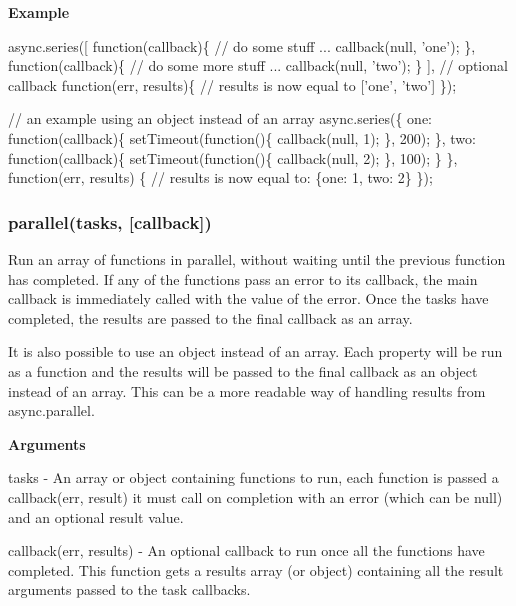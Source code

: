 {\bfseries Example}


\begin{DoxyCode}
async.series([
    function(callback)\{
        // do some stuff ...
        callback(null, 'one');
    \},
    function(callback)\{
        // do some more stuff ...
        callback(null, 'two');
    \}
],
// optional callback
function(err, results)\{
    // results is now equal to ['one', 'two']
\});


// an example using an object instead of an array
async.series(\{
    one: function(callback)\{
        setTimeout(function()\{
            callback(null, 1);
        \}, 200);
    \},
    two: function(callback)\{
        setTimeout(function()\{
            callback(null, 2);
        \}, 100);
    \}
\},
function(err, results) \{
    // results is now equal to: \{one: 1, two: 2\}
\});
\end{DoxyCode}
 



\label{_parallel}%
 \subsubsection*{parallel(tasks, \mbox{[}callback\mbox{]})}

Run an array of functions in parallel, without waiting until the previous function has completed. If any of the functions pass an error to its callback, the main callback is immediately called with the value of the error. Once the tasks have completed, the results are passed to the final callback as an array.

It is also possible to use an object instead of an array. Each property will be run as a function and the results will be passed to the final callback as an object instead of an array. This can be a more readable way of handling results from async.\+parallel.

{\bfseries Arguments}


\begin{DoxyItemize}
\item tasks -\/ An array or object containing functions to run, each function is passed a callback(err, result) it must call on completion with an error (which can be null) and an optional result value.
\item callback(err, results) -\/ An optional callback to run once all the functions have completed. This function gets a results array (or object) containing all the result arguments passed to the task callbacks.
\end{DoxyItemize}

